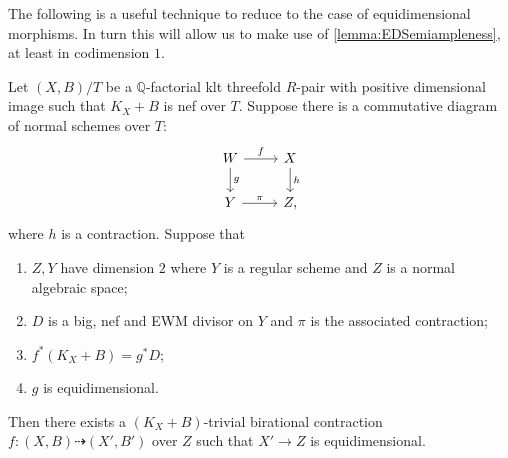\documentclass[a4paper,12pt]{book}
\begin{document}
	The following is a useful technique to reduce to the case of equidimensional morphisms. In turn this will allow us to make use of \autoref{lemma:EDSemiampleness}, at least in codimension $1$.
	
	\begin{proposition}\label{three}
		Let $(X,B)/T$ be a $\mathbb{Q}$-factorial klt threefold $R$-pair with positive dimensional image such that $K_{X}+B$ is nef over $T$. Suppose there is a commutative diagram of normal schemes over $T$:
		\[\begin{tikzcd}
		W \arrow[d, "g"] \arrow[r, "f"] & X \arrow[d, "h"]  \\
		Y     \arrow[r, "\pi"]           & Z,              
		\end{tikzcd}\]
		where $h$ is a contraction. Suppose  that 
		\begin{enumerate}
			\item  $Z,Y$ have dimension $2$ where $Y$ is a regular scheme and $Z$ is a normal algebraic space;
			\item $D$ is a big, nef and EWM divisor on $Y$ and $\pi$ is the associated contraction;
			\item  $f^{*}(K_{X}+B)=g^{*}D$;
			\item $g$ is equidimensional. 
		\end{enumerate} 
		
		Then there exists a $(K_X+B)$-trivial birational contraction $f \colon (X,B) \dashrightarrow (X', B')$ over $Z$ such that $X' \to Z$ is equidimensional. 
	\end{proposition}
\end{document}
